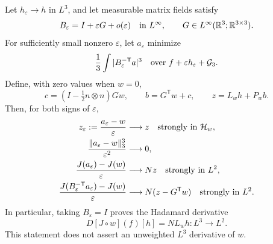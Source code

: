 \begin{theorem}\label{mr:response}
Let $h_\varepsilon\to h$ in $L^3$, and let measurable matrix fields satisfy
\[
 B_\varepsilon=I+\varepsilon G+o(\varepsilon)
       \quad\hbox{in }L^\infty,
 \qquad G\in L^\infty(\mathbb R^3;\mathbb R^{3\times3}).
\]
For sufficiently small nonzero $\varepsilon$, let $a_\varepsilon$
minimize
\[
 \frac13\int|B_\varepsilon^{-\mathsf T}a|^3
       \quad\hbox{over }f+\varepsilon h_\varepsilon+\mathcal G_3.
\]
Define, with zero values when $w=0$,
\[
 c=(I-\tfrac12n\otimes n)Gw,\qquad b=G^{\mathsf T}w+c,
 \qquad z=L_wh+P_wb.
\]
Then, for both signs of $\varepsilon$,
\begin{align}
 z_\varepsilon:=\frac{a_\varepsilon-w}{\varepsilon}
       &\longrightarrow z\quad\hbox{strongly in }\mathcal H_w,
       \label{mr:weighted-limit}\\
 \frac{\|a_\varepsilon-w\|_3^3}{\varepsilon^2}
       &\longrightarrow0,\label{mr:cubic-small}\\
 \frac{J(a_\varepsilon)-J(w)}{\varepsilon}
       &\longrightarrow Nz\quad\hbox{strongly in }L^2,\label{mr:natural-limit}\\
 \frac{J(B_\varepsilon^{-\mathsf T}a_\varepsilon)-J(w)}{\varepsilon}
       &\longrightarrow N(z-G^{\mathsf T}w)
          \quad\hbox{strongly in }L^2.\label{mr:physical-limit}
\end{align}
In particular, taking $B_\varepsilon=I$ proves the Hadamard derivative
\begin{equation}\label{mr:hadamard}
 D[J\circ w](f)[h]=NL_wh:L^3\longrightarrow L^2.
\end{equation}
This statement does not assert an unweighted $L^3$ derivative of $w$.
\end{theorem}

